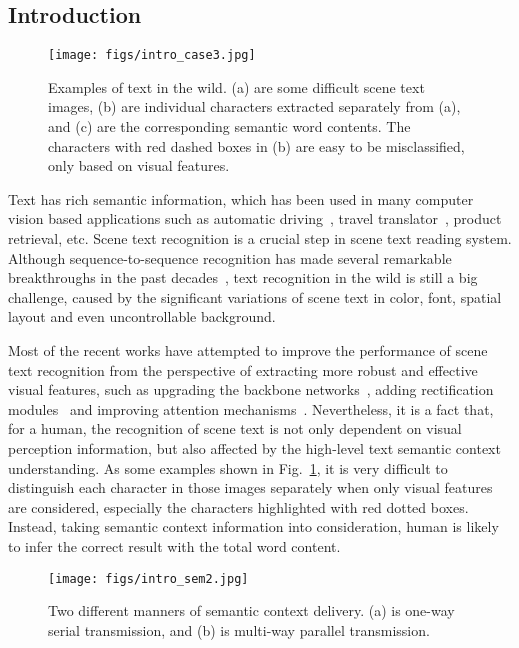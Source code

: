 \documentclass[10pt,twocolumn,letterpaper]{article}
\begin{document}
\begin{CJK}{UTF8}{gbsn}
\section{Introduction}\label{sec:intro}
\begin{figure}[!h]
\begin{center}
\texttt{[image: figs/intro\_case3.jpg]}
\end{center}
\vspace{-3mm}
\caption{Examples of text in the wild. (a) are some difficult scene text images, (b) are individual characters extracted separately from (a), and (c) are the corresponding semantic word contents. The characters with red dashed boxes in (b) are easy to be misclassified, only based on visual features.}
\label{fig:intro_case}
\vspace{-5mm}
\end{figure}

Text has rich semantic information, which has been used in many computer vision based applications such as automatic driving~\cite{yu2019videotext}, travel translator~\cite{wu2019editing}, product retrieval, etc. 
Scene text recognition is a crucial step in scene text reading system.
Although sequence-to-sequence recognition has made several remarkable breakthroughs in the past decades~\cite{lee2016recursive,wojna2017attention-2D,yang2017learning-2D}, text recognition in the wild is still a big challenge, caused by the significant variations of scene text in color, font, spatial layout and even uncontrollable background.

Most of the recent works have attempted to improve the performance of scene text recognition from the perspective of extracting more robust and effective visual features, such as upgrading the backbone networks~\cite{cheng2017focusing,liao2019mask,shi2018aster}, adding rectification modules~\cite{shi2016robust,shi2018aster,yang2019symmetry,zhan2019esir} and improving attention mechanisms~\cite{cheng2017focusing,wojna2017attention-2D,yang2017learning-2D}.  
Nevertheless, it is a fact that, for a human, the recognition of scene text is not only dependent on visual perception information, but also affected by the high-level text semantic context understanding.
As some examples shown in Fig.~\ref{fig:intro_case}, it is very difficult to distinguish each character in those images separately when only visual features are considered, especially the characters highlighted with red dotted boxes. 
Instead, taking semantic context information into consideration, human is likely to infer the correct result with the total word content.
\begin{figure}[!h]
\begin{center}
\texttt{[image: figs/intro\_sem2.jpg]}
\end{center}
\vspace{-5mm}
\caption{Two different manners of semantic context delivery. (a) is one-way serial transmission, and (b) is multi-way parallel transmission.}
\label{fig:intro_sem}
\vspace{-5mm}
\end{figure}


\end{CJK}
\end{document}
